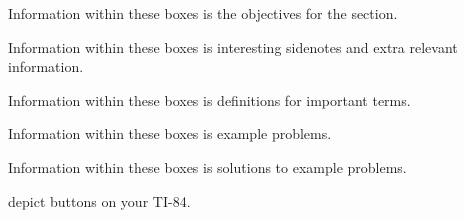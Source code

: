 \documentclass[11pt]{exam}
\begin{document}
\begin{center}  
\end{center}
\vspace{22pt}
\begin{tcolorbox}[objective]
    Information within these boxes is the objectives for the section.
\end{tcolorbox}
\vspace{22pt}
\begin{tcolorbox}[interesting]
    Information within these boxes is interesting sidenotes and extra relevant information.
\end{tcolorbox}
\vspace{22pt}
\begin{tcolorbox}[definition]
    Information within these boxes is definitions for important terms.
\end{tcolorbox}
\vspace{22pt}
\begin{tcolorbox}[example]
    Information within these boxes is example problems.
\end{tcolorbox}
\vspace{22pt}
\begin{tcolorbox}[solution]
    Information within these boxes is solutions to example problems.    
\end{tcolorbox}
\vspace{22pt}
 depict buttons on your TI-84.

\def\inputpathChapterOne{Chapter1/}


\def\inputpathChapterTwo{Chapter2/}


\def\inputpathChapterThree{Chapter3/}


\def\inputpathChapterFour{Chapter4/}

\end{document}
